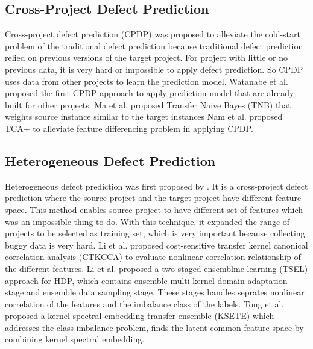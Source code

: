 \subsection{Cross-Project Defect Prediction}
Cross-project defect prediction (CPDP) was proposed to alleviate the cold-start problem of the traditional defect prediction because traditional defect prediction relied on previous versions of the target project.
For project with little or no previous data, it is very hard or impossible to apply defect prediction.
So CPDP uses data from other projects to learn the prediction model.
Watanabe et al. \cite{watanabe2008adapting} proposed the first CPDP approach to apply prediction model that are already built for other projects.
Ma et al. \cite{ma2012transfer} proposed Transfer Naive Bayes (TNB) that weights source instance similar to the target instances
Nam et al. \cite{nam2013transfer} proposed TCA+ to alleviate feature differencing problem in applying CPDP.

\subsection{Heterogeneous Defect Prediction}
Heterogeneous defect prediction was first proposed by \cite{nam2017heterogeneous}. It is a cross-project defect prediction where the source project and the target project have different feature space.
This method enables source project to have different set of features which was an impossible thing to do.
With this technique, it expanded the range of projects to be selected as training set, which is very important because collecting buggy data is very hard.
Li et al. \cite{li2018cost} proposed cost-sensitive transfer kernel canonical correlation analysis (CTKCCA) to evaluate nonlinear correlation relationship of the different features.
Li et al. \cite{li2019heterogeneous} proposed a two-staged ensemblme learning (TSEL) approach for HDP, which contains ensemble multi-kernel domain adaptation stage and ensemble data sampling stage. These stages handles seprates nonlinear correlation of the features and the imbalance class of the labels.
Tong et al. \cite{tong2019kernel} proposed a kernel spectral embedding transfer ensemble (KSETE) which addresses the class imbalance problem, finds the latent common feature space by combining kernel spectral embedding.


